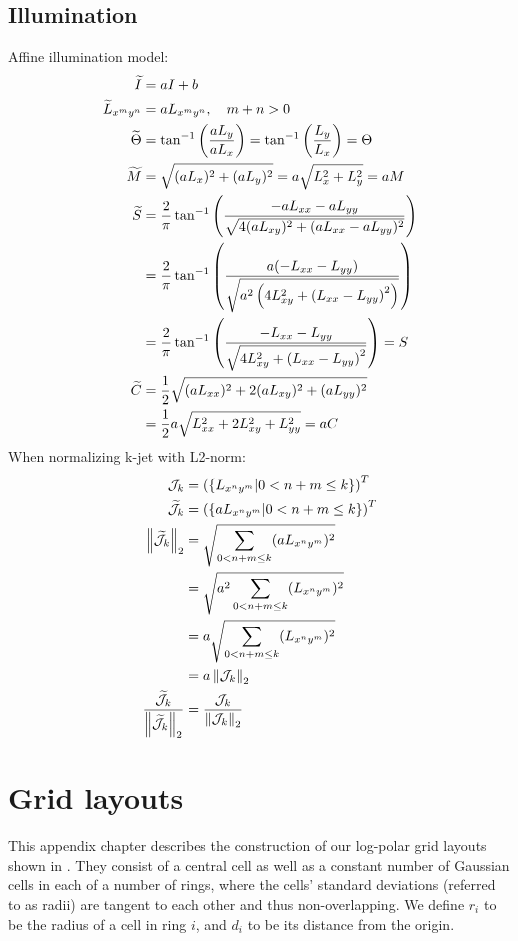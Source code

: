 \documentclass[thesis.tex]{subfiles}
\begin{document}
\section{Illumination} \label{apx:illumination}
%
Affine illumination model:
%
\begin{align*}
  \widetilde{I} &= a I  + b \\
  \widetilde{L}_{x^m y^n} &= a L_{x^m y^n}, \quad m+n > 0 \\
  \widetilde{\Theta} &= \tan^{-1} \left( \frac{a L_y}{a L_x} \right) = \tan^{-1} \left( \frac{L_y}{L_x} \right) = \Theta \\
  \widetilde{M} &= \sqrt{(a L_x)^2 + (a L_y)^2} = a \sqrt{L_x^2 + L_y^2} = a M \\
  \widetilde{S} &= \frac{2}{\pi} \tan^{-1} \left( \frac{-a L_{xx} - a L_{yy}}{\sqrt{4(aL_{xy})^2 + (aL_{xx} - aL_{yy})^2}} \right) \\
  &= \frac{2}{\pi} \tan^{-1} \left( \frac{a (-L_{xx} - L_{yy})}{\sqrt{a^2 \left(4L_{xy}^2 + \left(L_{xx} - L_{yy} \right)^2 \right)}} \right) \\
  &= \frac{2}{\pi} \tan^{-1} \left( \frac{-L_{xx} - L_{yy}}{\sqrt{4L_{xy}^2 + \left(L_{xx} - L_{yy} \right)^2}} \right) = S \\
  \widetilde{C} &= \frac12 \sqrt{(a L_{xx})^2 + 2 (a L_{xy})^2 + (a L_{yy})^2} \\
  &= \frac12 a \sqrt{L_{xx}^2 + 2 L_{xy}^2 + L_{yy}^2} = a C
\end{align*}
%
When normalizing k-jet with L2-norm:
%
\begin{align*}
  \mathcal{J}_k &= \left( \left \lbrace L_{x^n y^m} | 0 < n+m \leq k \right \rbrace \right)^T \\
  \widetilde{\mathcal{J}}_k &=\left( \left \lbrace a L_{x^n y^m} | 0 < n+m \leq k \right \rbrace \right)^T \\
  \left \| \widetilde{\mathcal{J}}_k \right \|_2 &= \sqrt{\sum_{0 < n+m \leq k} (a L_{x^n y^m})^2} \\
      &= \sqrt{a^2\sum_{0 < n+m \leq k} (L_{x^n y^m})^2} \\
      &= a\sqrt{\sum_{0 < n+m \leq k} (L_{x^n y^m})^2} \\
      &= a \left \| \mathcal{J}_k \right \|_2 \\
  \frac{\widetilde{\mathcal{J}}_k}{\left \| \widetilde{\mathcal{J}}_k \right \|_2} &=
      \frac{\mathcal{J}_k}{\left \| \mathcal{J}_k \right \|_2}
\end{align*}

\chapter{Grid layouts}
\label{apx:gridLayouts}
%
This appendix chapter describes the construction of our log-polar grid layouts shown in . They consist of a central cell as well as a constant number of Gaussian cells in each of a number of rings, where the cells' standard deviations (referred to as radii) are tangent to each other and thus non-overlapping. We define $r_i$ to be the radius of a cell in ring $i$, and $d_i$ to be its distance from the origin.
%
\end{document}
